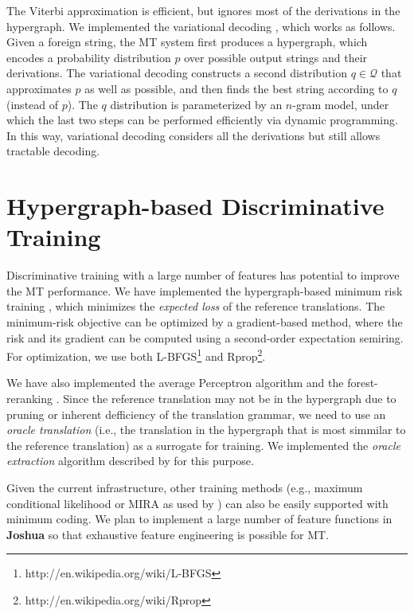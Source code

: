 \documentclass[11pt]{article}
\newcommand{\joshua}{\textbf{Joshua}\xspace}
\newcommand{\Q}{\mathcal{Q}}
\begin{document}
The Viterbi approximation is efficient, but ignores most of the derivations in the hypergraph.
We implemented the variational decoding \cite{variational-decoding-acl09}, which works as follows.
Given a foreign string, the MT system first produces a hypergraph, 
which encodes a probability distribution $p$ over 
possible output strings and their derivations.
The variational decoding constructs a second distribution $q \in \Q$ 
that approximates $p$ as well as possible, 
and then finds the best string according to $q$ (instead of $p$).
The $q$ distribution is parameterized by an $n$-gram model, under which 
the last two steps can be performed efficiently via dynamic programming.
In this way, variational decoding considers all the derivations but still
allows tractable decoding. 



\section{Hypergraph-based Discriminative Training}

Discriminative training with a large number of features has 
potential to improve the MT performance.
We have implemented the hypergraph-based minimum risk training \cite{li-eisner:2009:EMNLP},
which minimizes the {\em expected loss} of the reference translations.
The minimum-risk objective can be optimized by a gradient-based method, where
the risk and its gradient can be computed using a second-order expectation semiring.
For optimization, we use both L-BFGS\footnote{http://en.wikipedia.org/wiki/L-BFGS} 
and Rprop\footnote{http://en.wikipedia.org/wiki/Rprop}.

We have also implemented the average Perceptron algorithm and the forest-reranking \cite{zhifei-forest-reranking-galebook}.
Since the reference translation may not be in the hypergraph due to pruning or inherent
defficiency of the translation grammar, we need to use an {\em oracle translation} (i.e., the translation in
the hypergraph that is most simmilar to the reference translation) as a surrogate for training.
We implemented the {\em oracle extraction} algorithm described by 
for this purpose.

Given the current infrastructure, other training methods 
(e.g., maximum conditional likelihood or MIRA as used by )
can also be easily supported with minimum coding.
We plan to implement a large number of feature functions in \joshua so that exhaustive 
feature engineering is possible for MT.
\end{document}
